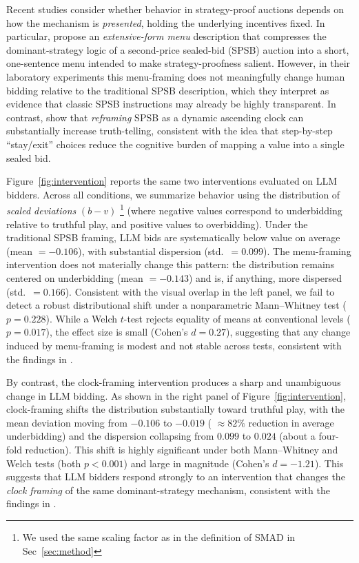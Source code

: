 Recent  studies consider whether behavior in strategy-proof auctions depends on how the mechanism is \emph{presented}, holding the underlying incentives fixed. In particular, \citet{gonczarowski2023strategyproofness} propose an \textit{extensive-form menu} description that compresses the dominant-strategy logic of a second-price sealed-bid (SPSB) auction into a short, one-sentence menu intended to make strategy-proofness salient. However, in their laboratory experiments this menu-framing does not meaningfully change human bidding relative to the traditional SPSB description, which they interpret as evidence that classic SPSB instructions may already be highly transparent. 
In contrast, \citet{breitmoser2022obviousness} show that \emph{reframing} SPSB as a dynamic ascending clock can substantially increase truth-telling, consistent with the idea that step-by-step ``stay/exit'' choices reduce the cognitive burden of mapping a value into a single sealed bid.

Figure~\ref{fig:intervention} reports the same two interventions evaluated on LLM bidders. Across all conditions, we summarize behavior using the distribution of \emph{scaled deviations} $(b-v)$ \footnote{We used the same scaling factor as in the definition of SMAD in Sec~\ref{sec:method}} (where negative values correspond to underbidding relative to truthful play, and positive values to overbidding). 
Under the traditional SPSB framing, LLM bids are systematically below value on average (mean $=-0.106$), with substantial dispersion (std.\ $=0.099$). The menu-framing intervention does not materially change this pattern: the distribution remains centered on underbidding (mean $=-0.143$) and is, if anything, more dispersed (std.\ $=0.166$). Consistent with the visual overlap in the left panel, we fail to detect a robust distributional shift under a nonparametric Mann--Whitney test ($p=0.228$). While a Welch $t$-test rejects equality of means at conventional levels ($p=0.017$), the effect size is small (Cohen's $d=0.27$), suggesting that any change induced by menu-framing is modest and not stable across tests, consistent with the findings in \citet{gonczarowski2023strategyproofness}.

By contrast, the clock-framing intervention produces a sharp and unambiguous change in LLM bidding. As shown in the right panel of Figure~\ref{fig:intervention}, clock-framing shifts the distribution substantially toward truthful play, with the mean deviation moving from $-0.106$ to $-0.019$ ( $\approx 82\%$ reduction in average underbidding) and the dispersion collapsing from $0.099$ to $0.024$ (about a four-fold reduction). This shift is highly significant under both Mann--Whitney and Welch tests (both $p<0.001$) and large in magnitude (Cohen's $d=-1.21$). This suggests that LLM bidders respond strongly to an intervention that changes the \emph{clock  framing} of the same dominant-strategy mechanism, consistent with the findings in \citet{breitmoser2022obviousness}.





